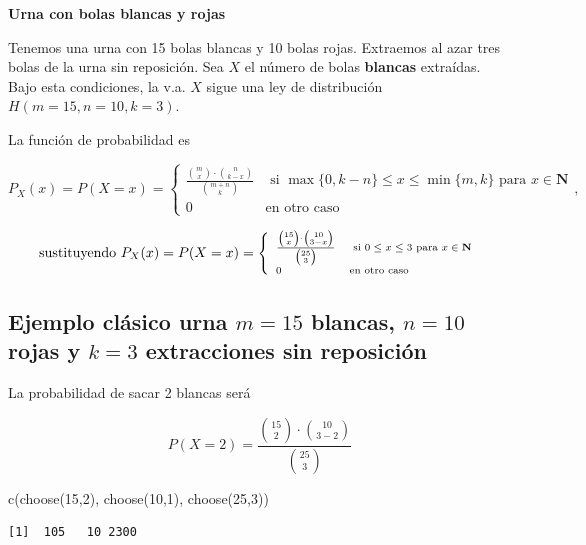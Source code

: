 \documentclass[
  letterpaper,
  DIV=11,
  numbers=noendperiod]{scrreprt}
\newenvironment{Shaded}{\begin{snugshade}}{\end{snugshade}}
\newcommand{\DecValTok}[1]{\textcolor[rgb]{0.68,0.00,0.00}{#1}}
\newcommand{\FunctionTok}[1]{\textcolor[rgb]{0.28,0.35,0.67}{#1}}
\newcommand{\NormalTok}[1]{\textcolor[rgb]{0.00,0.23,0.31}{#1}}
\begin{document}
\textbf{Urna con bolas blancas y rojas}

Tenemos una urna con 15 bolas blancas y 10 bolas rojas. Extraemos al
azar tres bolas de la urna sin reposición. Sea \(X\) el número de bolas
\textbf{blancas} extraídas. Bajo esta condiciones, la v.a. \(X\) sigue
una ley de distribución \(H(m=15,n=10,k=3)\).

La función de probabilidad es

\[
P_X(x)=P(X=x)=\left\{
\begin{array}{ll}
\frac{\binom{m}{x}\cdot \binom{n}{k-x}}{\binom{m+n}{k}} & \mbox{ si }
\max\{0,k-n\}\leq x \leq \min\{m,k\} \mbox { para } x\in \mathbf{N}\\
0 & \mbox{en otro caso}\end{array}\right.,
\]

\[\mbox{sustituyendo }\scriptsize{
P_X(x)=P(X=x)=\left\{
\begin{array}{ll}
\frac{\binom{15}{x}\cdot \binom{10}{3-x}}{\binom{25}{3}} & \mbox{ si }
0\leq x \leq 3 \mbox { para } x\in \mathbf{N}\\
0 & \mbox{en otro caso}\end{array}\right.
}\]

\subsection{\texorpdfstring{Ejemplo clásico urna \(m=15\) blancas,
\(n=10\) rojas y \(k=3\) extracciones sin
reposición}{Ejemplo clásico urna m=15 blancas, n=10 rojas y k=3 extracciones sin reposición}}\label{ejemplo-cluxe1sico-urna-m15-blancas-n10-rojas-y-k3-extracciones-sin-reposiciuxf3n}

La probabilidad de sacar 2 blancas será

\[
P(X=2)=\frac{\binom{15}{2}\cdot \binom{10}{3-2}}{\binom{25}{3}}
\]

\begin{Shaded}
\begin{Highlighting}[]
\FunctionTok{c}\NormalTok{(}\FunctionTok{choose}\NormalTok{(}\DecValTok{15}\NormalTok{,}\DecValTok{2}\NormalTok{), }\FunctionTok{choose}\NormalTok{(}\DecValTok{10}\NormalTok{,}\DecValTok{1}\NormalTok{), }\FunctionTok{choose}\NormalTok{(}\DecValTok{25}\NormalTok{,}\DecValTok{3}\NormalTok{))}
\end{Highlighting}
\end{Shaded}

\begin{verbatim}
[1]  105   10 2300
\end{verbatim}
\end{document}
